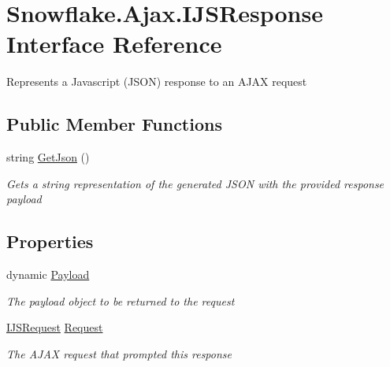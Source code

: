 \hypertarget{interface_snowflake_1_1_ajax_1_1_i_j_s_response}{}\section{Snowflake.\+Ajax.\+I\+J\+S\+Response Interface Reference}
\label{interface_snowflake_1_1_ajax_1_1_i_j_s_response}


Represents a Javascript (J\+S\+O\+N) response to an A\+J\+A\+X request  


\subsection*{Public Member Functions}
\begin{DoxyCompactItemize}
\item 
string \hyperlink{interface_snowflake_1_1_ajax_1_1_i_j_s_response_aa48e2c58da48c0bc78308a51974fc34b}{Get\+Json} ()
\begin{DoxyCompactList}\small\item\em Gets a string representation of the generated J\+S\+O\+N with the provided response payload \end{DoxyCompactList}\end{DoxyCompactItemize}
\subsection*{Properties}
\begin{DoxyCompactItemize}
\item 
dynamic \hyperlink{interface_snowflake_1_1_ajax_1_1_i_j_s_response_aca4a568b350d1bcb3df0a5484e311670}{Payload}
\begin{DoxyCompactList}\small\item\em The payload object to be returned to the request \end{DoxyCompactList}\item 
\hyperlink{interface_snowflake_1_1_ajax_1_1_i_j_s_request}{I\+J\+S\+Request} \hyperlink{interface_snowflake_1_1_ajax_1_1_i_j_s_response_ae35c86f83855bf0a8dcf50257b802b1e}{Request}
\begin{DoxyCompactList}\small\item\em The A\+J\+A\+X request that prompted this response \end{DoxyCompactList}\end{DoxyCompactItemize}


